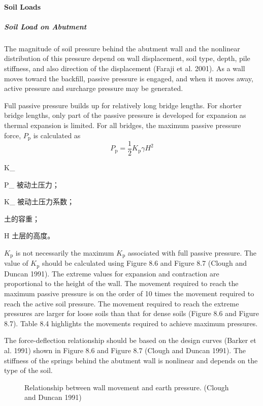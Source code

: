\paragraph{Soil Loads}
\subparagraph{Soil Load on Abutment}
The magnitude of soil pressure behind the abutment wall and the nonlinear distribution of this pressure depend on
wall displacement, soil type, depth, pile stiffness, and also direction of the displacement (Faraji et al. 2001). As a wall
moves toward the backfill, passive pressure is engaged, and when it moves away, active pressure and surcharge
pressure may be generated.

Full passive pressure builds up for relatively long bridge lengths. For shorter bridge lengths, only part of the
passive pressure is developed for expansion as thermal expansion is limited. For all bridges, the maximum passive
pressure force, $P_\text{p}$ is calculated as
\begin{equation}
  P_\text{p} = \frac{1}{2} K_\text{p} \gamma H^2
\end{equation}
\begin{EqDesc}{K_}
  \item[P_\text{p}] 被动土压力；
  \item[K_\text{p}] 被动土压力系数；
  \item[\gamma] 土的容重；
  \item[H] 土层的高度。
\end{EqDesc}

$K_\text{p}$ is not necessarily the maximum $K_\text{p}$ associated with full passive pressure. The value of $K_\text{p}$ should be
calculated using Figure 8.6 and Figure 8.7 (Clough and Duncan 1991). The extreme values for expansion and
contraction are proportional to the height of the wall. The movement required to reach the maximum passive pressure
is on the order of 10 times the movement required to reach the active soil pressure. The movement required to reach
the extreme pressures are larger for loose soils than that for dense soils (Figure 8.6 and Figure 8.7). Table 8.4
highlights the movements required to achieve maximum pressures.

The force-deflection relationship should be based on the design curves (Barker et al. 1991) shown in Figure 8.6
and Figure 8.7 (Clough and Duncan 1991). The stiffness of the springs behind the abutment wall is nonlinear and
depends on the type of the soil.

\begin{figure}
  \caption{Relationship between wall movement and earth pressure. (Clough and Duncan 1991)}\label{fig:wall-movement-earth-pressure}
\end{figure}

